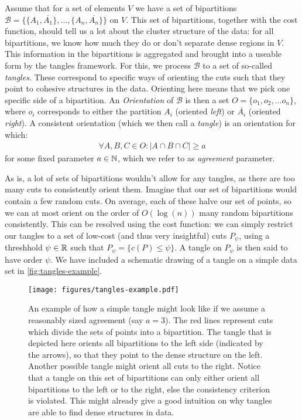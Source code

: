 Assume that for a set of elements $V$ we have a set of bipartitions $\mathcal{B} = \{\{A_1, \overline{A_1}\}, \ldots, \{A_n, \overline{A_n}\} \} $ on $V$.
This set of bipartitions, together with the cost function, should tell us a lot about the cluster structure of the data:
for all bipartitions, we know how much they do or don't separate dense regions in $V$. This information in the bipartitions is aggregated and brought into a useable form by the tangles framework. 
For this, we process $\mathcal{B}$ to a set of so-called \textit{tangles}. These
correspond to specific ways of orienting the cuts such that they point to cohesive structures in the data. 
Orienting here means that we pick one specific side of a bipartition. An \textit{Orientation} of $\mathcal{B}$ is then a set $O = \{o_1, o_2, \ldots o_n\}$, where $o_i$ 
corresponds to either the partition $A_i$ (oriented \textit{left}) or $\overline{A_i}$ (oriented \textit{right}). A consistent orientation (which we then call a \textit{tangle}) is an orientation for which:
\begin{align}
    \forall A,B,C \in O: \left| A \cap B \cap C \right| \ge a
\end{align}
for some fixed parameter $a \in \mathbb{N}$, which we refer to as \textit{agreement} parameter. 

As is, a lot of sets of bipartitions wouldn't allow for any tangles, as there are too many cuts to consistently orient them. 
Imagine that our set of bipartitions would contain a few random cuts. 
On average, each of these halve our set of points, so we can at most orient on the order of $O(\log(n))$ many random bipartitions consistently.
This can be resolved using the cost function: we can simply restrict our tangles to a set of low-cost (and thus very insightful) cuts $P_{\psi}$, using a threshhold $\psi \in \mathbb{R}$ such that
$P_{\psi} = \{ c(P) \le \psi \}$. A tangle on $P_{\psi}$ is then said to have order $\psi$. We have included a schematic drawing of a tangle on a simple data set in \autoref{fig:tangles-example}.


\begin{figure}[h]
    \centering
    \texttt{[image: figures/tangles-example.pdf]}
    \caption{An example of how a simple tangle might look like if we assume a reasonably sized agreement (say $a = 3$). 
        The red lines represent cuts which divide the sets of points into a bipartition.  
        The tangle that is depicted here orients all bipartitions to the left side (indicated by the arrows), 
        so that they point to the dense structure on the left. 
        Another possible tangle might orient all cuts to the right. Notice that a tangle on this set of bipartitions can only either orient all bipartitions to the left or to the right, else
        the consistency criterion is violated. This might already give a good intuition on why tangles are able to find dense structures in data.}
    \label{fig:tangles-example}
\end{figure}

